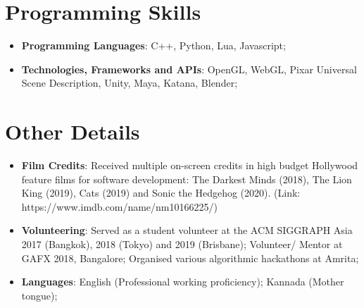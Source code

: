 \documentclass[a4paper,11pt]{article}
\newcommand{\resumeItem}[2]{
  \item\small{
    \textbf{#1}{: #2 \vspace{-2pt}}
  }
}
\newcommand{\resumeSubItem}[2]{
  \resumeItem{#1}{#2}
  \vspace{-4pt}
}
\newcommand{\resumeSubHeadingListStart}{
  \begin{itemize}[leftmargin=*]
}
\newcommand{\resumeSubHeadingListEnd}{
  \end{itemize}
}
\begin{document}
  \section{Programming  Skills}
    \resumeSubHeadingListStart
      \resumeSubItem{Programming Languages}
        {C++, Python, Lua, Javascript;}
      \resumeSubItem{Technologies, Frameworks and APIs}
        {OpenGL, WebGL, Pixar Universal Scene Description, Unity, Maya, Katana, Blender;}
    \resumeSubHeadingListEnd

  \section{Other Details}
    \resumeSubHeadingListStart
      \resumeSubItem{Film Credits}
        {Received multiple on-screen credits in high budget Hollywood feature films for software development: The Darkest Minds (2018), The Lion King (2019), Cats (2019) and Sonic the Hedgehog (2020). (Link: https://www.imdb.com/name/nm10166225/)}
      \resumeSubItem{Volunteering}
        {Served as a student volunteer at the ACM SIGGRAPH Asia 2017 (Bangkok), 2018 (Tokyo) and 2019 (Brisbane);
          Volunteer/ Mentor at GAFX 2018, Bangalore;
          Organised various algorithmic hackathons at Amrita; }
      \resumeSubItem{Languages}
        {English (Professional working proficiency); Kannada (Mother tongue);}
    \resumeSubHeadingListEnd

\end{document}
